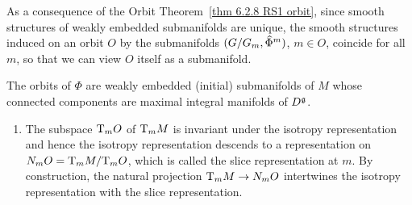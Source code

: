 As a consequence of the Orbit Theorem~\ref{thm 6.2.8 RS1 orbit}, since smooth structures of weakly embedded submanifolds are unique, the smooth structures induced on an orbit $O$ by the submanifolds $(G\slash G_m,\wh{\Phi}^m)$, $m\in O$, coincide for all $m$, so that we can view $O$ itself as a submanifold.  

\begin{cor}[{{\cite[Cor.~6.2.9]{RS1}}}]
    The orbits of $\Phi$ are weakly embedded (initial) submanifolds of $M$ whose connected components are maximal integral manifolds of $D^{\mathfrak{g}}$.
\end{cor}

\begin{rem}[{{\cite[Rem.~6.2.10]{RS1}}}]\label{rem 6.2.10 RS1}
    \begin{enumerate}
        \item The subspace $\mathrm{T}_mO$ of $\mathrm{T}_mM$ is invariant under the isotropy representation and hence the isotropy representation descends to a representation on $N_mO=\mathrm{T}_mM\slash \mathrm{T}_mO$, which is called the slice representation at $m$. By construction, the natural projection $\mathrm{T}_mM\to N_mO$ intertwines the isotropy representation with the slice representation.


\end{enumerate}
\end{rem}
